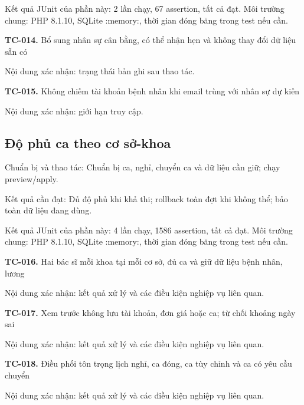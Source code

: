 Kết quả JUnit của phần này:\allowbreak{} 2 lần chạy, 67 assertion, tất cả đạt.\allowbreak{} Môi trường chung:\allowbreak{} PHP 8.\allowbreak{}1.\allowbreak{}10, SQLite :\allowbreak{}memory:\allowbreak{}, thời gian đóng băng trong test nếu cần.\allowbreak{}

\noindent\textbf{TC-014.} Bổ sung nhân sự cân bằng, có thể nhận hẹn và không thay đổi dữ liệu sẵn có\par
Nội dung xác nhận:\allowbreak{} trạng thái bản ghi sau thao tác.\allowbreak{}

\noindent\textbf{TC-015.} Không chiếm tài khoản bệnh nhân khi email trùng với nhân sự dự kiến\par
Nội dung xác nhận:\allowbreak{} giới hạn truy cập.\allowbreak{}


\par\vspace{8pt}

\subsection{Độ phủ ca theo cơ sở-khoa}
Chuẩn bị và thao tác:\allowbreak{} Chuẩn bị ca, nghỉ, chuyển ca và dữ liệu cần giữ; chạy preview/\allowbreak{}apply.\allowbreak{}

Kết quả cần đạt:\allowbreak{} Đủ độ phủ khi khả thi; rollback toàn đợt khi không thể; bảo toàn dữ liệu đang dùng.\allowbreak{}

Kết quả JUnit của phần này:\allowbreak{} 4 lần chạy, 1586 assertion, tất cả đạt.\allowbreak{} Môi trường chung:\allowbreak{} PHP 8.\allowbreak{}1.\allowbreak{}10, SQLite :\allowbreak{}memory:\allowbreak{}, thời gian đóng băng trong test nếu cần.\allowbreak{}

\noindent\textbf{TC-016.} Hai bác sĩ mỗi khoa tại mỗi cơ sở, đủ ca và giữ dữ liệu bệnh nhân, lương\par
Nội dung xác nhận:\allowbreak{} kết quả xử lý và các điều kiện nghiệp vụ liên quan.\allowbreak{}

\noindent\textbf{TC-017.} Xem trước không lưu tài khoản, đơn giá hoặc ca; từ chối khoảng ngày sai\par
Nội dung xác nhận:\allowbreak{} kết quả xử lý và các điều kiện nghiệp vụ liên quan.\allowbreak{}

\noindent\textbf{TC-018.} Điều phối tôn trọng lịch nghỉ, ca đóng, ca tùy chỉnh và ca có yêu cầu chuyển\par
Nội dung xác nhận:\allowbreak{} kết quả xử lý và các điều kiện nghiệp vụ liên quan.\allowbreak{}

